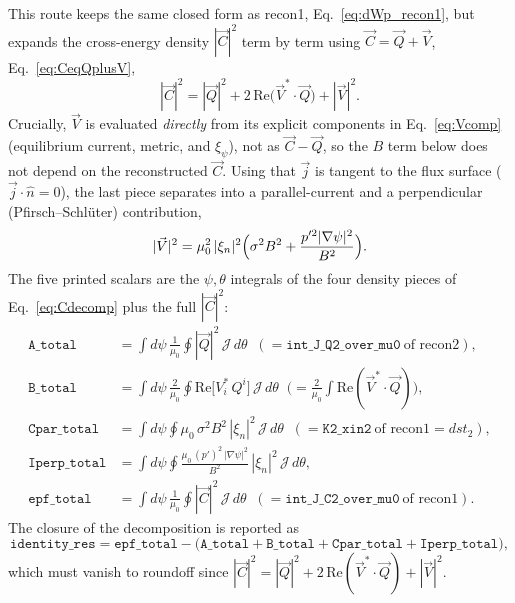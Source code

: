 \documentclass[10pt,a4paper]{article}
\numberwithin{equation}{section}
\begin{document}
This route keeps the same closed form as recon1, Eq.~\eqref{eq:dWp_recon1},
but expands the cross-energy density $|\vec C|^2$ term by term using
$\vec C=\vec Q+\vec V$, Eq.~\eqref{eq:CeqQplusV},
\begin{equation}
|\vec C|^2=|\vec Q|^2+2\,\mathrm{Re}\bigl(\vec V^{*}\!\cdot\vec Q\bigr)
+|\vec V|^2 .
\label{eq:Cdecomp}
\end{equation}
Crucially, $\vec V$ is evaluated \emph{directly} from its explicit components
in Eq.~\eqref{eq:Vcomp} (equilibrium current, metric, and $\xi_\psi$), not as
$\vec C-\vec Q$, so the $B$ term below does not depend on the reconstructed
$\vec C$.  Using that $\vec j$ is tangent to the flux surface ($\vec
j\cdot\hat n=0$), the last piece separates into a parallel-current and a
perpendicular (Pfirsch--Schl\"uter) contribution,
\begin{equation}
|\vec V|^2=\mu_0^2\,|\xi_n|^2\Bigl(\sigma^2B^2
+\frac{p'^2|\nabla\psi|^2}{B^2}\Bigr).
\end{equation}
The five printed scalars are the $\psi,\theta$ integrals of the four density
pieces of Eq.~\eqref{eq:Cdecomp} plus the full $|\vec C|^2$:
\begin{align}
\texttt{A\_total}
&=\int\! d\psi\,\frac{1}{\mu_0}\oint|\vec Q|^2\,\mathcal J\,d\theta
 \;\;(=\texttt{int\_J\_Q2\_over\_mu0}\ \text{of recon2}),\\
\texttt{B\_total}
&=\int\! d\psi\,\frac{2}{\mu_0}\oint
  \mathrm{Re}\!\big[V_i^{*}\,Q^{i}\big]\,\mathcal J\,d\theta
 \;\;\bigl(=\tfrac{2}{\mu_0}\!\int\!\mathrm{Re}(\vec V^{*}\!\cdot\vec Q)\bigr),\\
\texttt{Cpar\_total}
&=\int\! d\psi\oint \mu_0\,\sigma^2 B^2\,|\xi_n|^2\,\mathcal J\,d\theta
 \;\;(=\texttt{K2\_xin2}\ \text{of recon1}=dst_2),\\
\texttt{Iperp\_total}
&=\int\! d\psi\oint \frac{\mu_0\,(p')^2\,|\nabla\psi|^2}{B^2}\,|\xi_n|^2\,
  \mathcal J\,d\theta,\\
\texttt{epf\_total}
&=\int\! d\psi\,\frac{1}{\mu_0}\oint|\vec C|^2\,\mathcal J\,d\theta
 \;\;(=\texttt{int\_J\_C2\_over\_mu0}\ \text{of recon1}).
\end{align}
The closure of the decomposition is reported as
\begin{equation}
\texttt{identity\_res}
=\texttt{epf\_total}
-\bigl(\texttt{A\_total}+\texttt{B\_total}
       +\texttt{Cpar\_total}+\texttt{Iperp\_total}\bigr),
\end{equation}
which must vanish to roundoff since
$|\vec C|^2=|\vec Q|^2+2\,\mathrm{Re}(\vec V^{*}\!\cdot\vec Q)+|\vec V|^2$.
\end{document}

